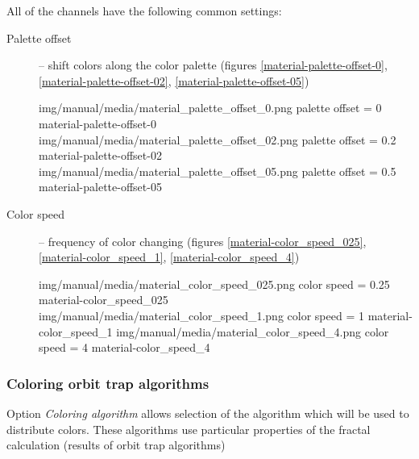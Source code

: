 All of the channels have the following common settings:
\begin{description}
	\item[Palette offset] -- shift colors along the color palette (figures \ref{material-palette-offset-0}, \ref{material-palette-offset-02}, \ref{material-palette-offset-05})
	
	\threeImagesWithTwoCaptionsFullWidth
	{img/manual/media/material_palette_offset_0.png}
	{palette offset = 0}
	{material-palette-offset-0}
	{img/manual/media/material_palette_offset_02.png}
	{palette offset = 0.2}
	{material-palette-offset-02}
	{img/manual/media/material_palette_offset_05.png}
	{palette offset = 0.5}
	{material-palette-offset-05}
	
	\item[Color speed] -- frequency of color changing (figures \ref{material-color_speed_025}, \ref{material-color_speed_1}, \ref{material-color_speed_4})
	
	\threeImagesWithTwoCaptionsFullWidth
	{img/manual/media/material_color_speed_025.png}
	{color speed = 0.25}
	{material-color_speed_025}
	{img/manual/media/material_color_speed_1.png}
	{color speed = 1}
	{material-color_speed_1}
	{img/manual/media/material_color_speed_4.png}
	{color speed = 4}
	{material-color_speed_4}
\end{description}
	
\subsubsection{Coloring orbit trap algorithms}\label{materials-coloring-0rbi-trap-algorithms}
	
Option \emph{Coloring algorithm} allows selection of the algorithm which will be used to distribute colors. These algorithms use particular properties of the fractal calculation (results of orbit trap algorithms)

